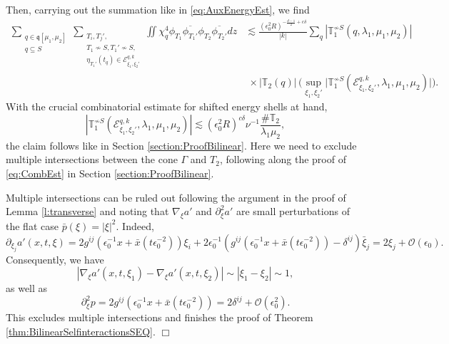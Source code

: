 \documentclass{amsart}
\theoremstyle{definition}
\newcommand{\T}{\mathbb{T}}
\begin{document}
Then, carrying out the summation like in \eqref{eq:AuxEnergyEst}, we find
\begin{equation*}
\begin{split}
    \sum_{\substack{q \in \mathfrak{q}[\mu_1,\mu_2] \\  q \subseteq S}} \sum_{\substack{T_i,T_j',\\ T_1 \not\sim S, T_1' \not\sim S, \\ \eta_{T_1'}(t_q) \in \mathcal{E}^{q,k}_{\xi_1,\xi_2'}}} \iint \chi_q^4 \phi_{T_1} \overline{\phi_{T_1'}} \phi_{T_2} \overline{\phi_{T_2'}} dz &\lesssim \frac{(\epsilon_0^2 R)^{-\frac{d-1}{2} + c \delta}}{|k|} \sum_q | \T_1^{\not\sim S}(q,\lambda_1,\mu_1,\mu_2)| \\
    &\; \times |\T_2(q)| \, \big( \sup_{\xi_1,\xi_2'} \big| \T_1^{\not\sim S}(\mathcal{E}^{q,k}_{\xi_1,\xi_2'},\lambda_1,\mu_1,\mu_2) \big| \big).
\end{split}
\end{equation*}
With the crucial combinatorial estimate for shifted energy shells at hand,
\begin{equation}
\label{eq:ModCombEst}
|\T_1^{\not\sim S}(\mathcal{E}^{q,k}_{\xi_1,\xi_2'},\lambda_1,\mu_1,\mu_2)| \lesssim (\epsilon_0^2 R)^{c \delta} \nu^{-1} \frac{\# \T_2}{\lambda_1 \mu_2},
\end{equation}
the claim follows like in Section \ref{section:ProofBilinear}. Here we need to exclude multiple intersections between the cone $\Gamma$ and $T_2$, following along the proof of \eqref{eq:CombEst} in Section \ref{section:ProofBilinear}.

Multiple intersections can be ruled out following the argument in the proof of Lemma \ref{l:transverse} and noting that $\nabla_{\xi} a'$ and $\partial^2_{\xi} a'$ are small perturbations of the flat case $\bar{p}(\xi) = |\xi|^2$. Indeed,
\begin{equation*}
\partial_{\xi_j} a'(x,t,\xi)= 2g^{ij}(\epsilon_0^{-1} x + \bar{x}(t \epsilon_0^{-2})) \xi_i + 2 \epsilon_0^{-1} (g^{ij}(\epsilon_0^{-1} x + \bar{x}(t \epsilon_0^{-2})) - \delta^{ij}) \bar{\xi}_j = 2 \xi_j + \mathcal{O}(\epsilon_0).
\end{equation*}
Consequently, we have
\[
|\nabla_{\xi} a'(x,t,\xi_1) - \nabla_{\xi} a'(x,t,\xi_2)| \sim |\xi_1 - \xi_2| \sim 1, 
\]
as well as 
\[
\partial_{\xi}^2 p = 2 g^{ij}(\epsilon_0^{-1} x+  \bar{x}(t \epsilon_0^{-2})) = 2 \delta^{ij} + \mathcal{O}(\epsilon_0^2).
\]
This excludes multiple intersections and finishes the proof of Theorem \ref{thm:BilinearSelfinteractionsSEQ}. \hfill $\Box$
\end{document}
